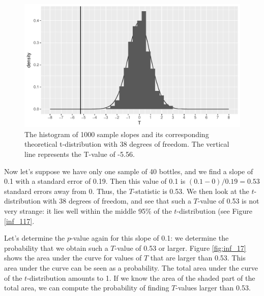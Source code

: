 \documentclass[]{report}\usepackage[]{graphicx}\usepackage[]{color}
\makeatletter
\def\maxwidth{ %
  \ifdim\Gin@nat@width>\linewidth
    \linewidth
  \else
    \Gin@nat@width
  \fi
}
\newenvironment{knitrout}{}{} %
\makeatother
\begin{document}
\begin{knitrout}
\color{fgcolor}\begin{figure}

{\centering \includegraphics[width=\maxwidth]{figure/inf_117-1} 

}

\caption[The histogram of 1000 sample slopes and its corresponding theoretical t-distribution with 38 degrees of freedom]{The histogram of 1000 sample slopes and its corresponding theoretical t-distribution with 38 degrees of freedom. The vertical line represents the T-value of -5.56.}\label{fig:inf_117}
\end{figure}


\end{knitrout}

Now let's suppose we have only one sample of 40 bottles, and we find a slope of 0.1 with a standard error of 0.19. Then this value of 0.1 is $(0.1-0)/0.19=0.53$ standard errors away from 0. Thus, the $T$-statistic is 0.53. We then look at the $t$-distribution with 38 degrees of freedom, and see that such a $T$-value of 0.53 is not very strange: it lies well within the middle 95\% of the $t$-distribution (see Figure \ref{inf_117}.

Let's determine the $p$-value again for this slope of 0.1: we determine the probability that we obtain such a $T$-value of 0.53 or larger. Figure \ref{fig:inf_17} shows the area under the curve for values of $T$ that are larger than 0.53. This area under the curve can be seen as a probability. The total area under the curve of the $t$-distribution amounts to 1. If we know the area of the shaded part of the total area, we can compute the probability of finding $T$-values larger than 0.53.
\end{document}
